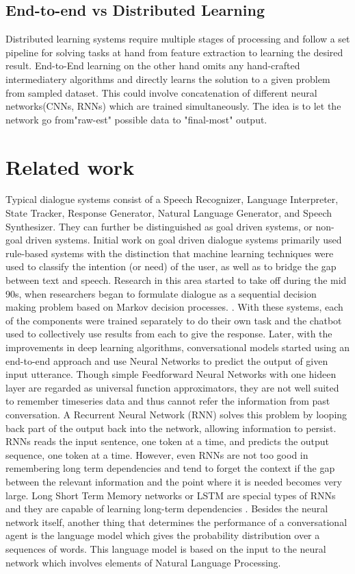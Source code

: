 \documentclass[letterpaper] {article} %
\begin{document}
\subsection{End-to-end vs Distributed Learning}
Distributed learning systems require multiple stages of processing and follow a set pipeline for solving tasks at hand from feature extraction to learning the desired result. End-to-End learning on the other hand omits any hand-crafted intermediatery algorithms and directly learns the solution to a given problem from sampled dataset. This could involve concatenation of different neural networks(CNNs, RNNs) which are trained simultaneously. The idea is to let the network go from"raw-est" possible data to "final-most" output.

\section{Related work}
Typical dialogue systems consist of a Speech Recognizer, Language Interpreter, State Tracker, Response Generator, Natural Language Generator, and Speech Synthesizer. They can further be distinguished as goal driven systems, or non-goal driven systems. Initial work on goal driven dialogue systems primarily used rule-based systems with the distinction that machine learning techniques were used to classify the intention (or need) of the user, as well as to bridge the gap between text and speech\cite{serban2015survey}. Research in this area started to take off during the mid 90s, when researchers began to formulate dialogue as a sequential decision making problem based on Markov decision processes. \cite{young2013pomdp} \cite{singh2000reinforcement} \cite{pieraccini2009we}. With these systems, each of the components were trained separately to do their own task and the chatbot used to collectively use results from each to give the response. Later, with the improvements in deep learning algorithms, conversational models started using an end-to-end approach and use Neural Networks to predict the output of given input utterance. Though simple Feedforward Neural Networks with one hideen layer are regarded as universal function approximators, they are not well suited to remember timeseries data and thus cannot refer the information from past conversation. A Recurrent Neural Network (RNN) solves this problem by looping back part of the output back into the network, allowing information to persist. RNNs reads the input sentence, one token at a time, and predicts the output sequence, one token at a time. However, even RNNs are not too good in remembering long term dependencies and tend to forget the context if the gap between the relevant information and the point where it is needed becomes very large. Long Short Term Memory networks or LSTM are special types of RNNs and they are capable of learning long-term dependencies \cite{Hochreiter:1997:LSM:1246443.1246450}. Besides the neural network itself, another thing that determines the performance of a conversational agent is the language model which gives the probability distribution over a sequences of words. This language model is based on the input to the neural network which involves elements of Natural Language Processing.\\\\
\end{document}
